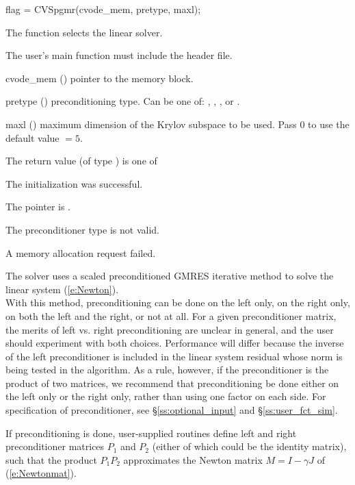 {
  flag = CVSpgmr(cvode\_mem, pretype, maxl);
}
{
  The function  selects the {\cvspgmr} linear solver. 

  The user's main function must include the  header file.
}
{
  \begin{args}
  \item[cvode\_mem] ()
    pointer to the {\cvode} memory block.
  \item[pretype] ()
    preconditioning type. Can be one of: , , , or .
  \item[maxl] ()
    maximum dimension of the Krylov subspace to be used. Pass $0$ to use the 
    default value $=5$.
  \end{args}
}
{
  The return value  (of type ) is one of
  \begin{args}
  \item[\Id{SUCCESS}] 
    The {\cvspgmr} initialization was successful.
  \item[\Id{LIN\_NO\_MEM}]
    The  pointer is .
  \item[\Id{LIN\_ILL\_INPUT}]
    The preconditioner type  is not valid.
  \item[\Id{LMEM\_FAIL}]
    A memory allocation request failed.
  \end{args}
}
{
  The {\cvspgmr} solver uses a scaled preconditioned GMRES
  iterative method to solve the linear system (\ref{e:Newton}).\\
  With this {\spgmr} method, preconditioning 
  can be done on the left only, on the right only, on both the left and the right, 
  or not at all.  For a given preconditioner matrix, the merits of left vs. right
  preconditioning are unclear in general, and the user should experiment
  with both choices.  Performance will differ because the inverse of the
  left preconditioner is included in the linear system residual whose
  norm is being tested in the {\spgmr} algorithm.  As a rule, however, if
  the preconditioner is the product of two matrices, we recommend that
  preconditioning be done either on the left only or the right only,
  rather than using one factor on each side. For specification of preconditioner,
  see \S\ref{ss:optional_input} and \S\ref{ss:user_fct_sim}.

  If preconditioning is done, user-supplied routines define left and right 
  preconditioner matrices $P_1$ and $P_2$ (either of which could be the identity matrix),
  such that the product $P_1 P_2$ approximates the Newton matrix $M=I-\gamma J$ of 
  (\ref{e:Newtonmat}).
}

